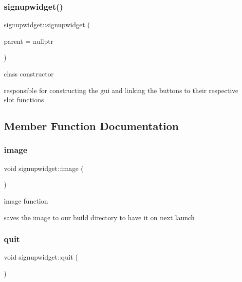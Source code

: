 \subsubsection{\texorpdfstring{signupwidget()}{signupwidget()}}
{\footnotesize\ttfamily signupwidget\+::signupwidget (\begin{DoxyParamCaption}\item[{Q\+Widget $\ast$}]{parent = {\ttfamily nullptr} }\end{DoxyParamCaption})\hspace{0.3cm}{\ttfamily [explicit]}}



class constructor 

responsible for constructing the gui and linking the buttons to their respective slot functions 

\subsection{Member Function Documentation}
\mbox{\label{classsignupwidget_a70de3f9e8d27a1704a3678d3148f6e46}} 
\subsubsection{\texorpdfstring{image}{image}}
{\footnotesize\ttfamily void signupwidget\+::image (\begin{DoxyParamCaption}{ }\end{DoxyParamCaption})\hspace{0.3cm}{\ttfamily [slot]}}



image function 

saves the image to our build directory to have it on next launch \mbox{\label{classsignupwidget_a61682f0dccbdcaa63a4b07434dc52e62}} 
\subsubsection{\texorpdfstring{quit}{quit}}
{\footnotesize\ttfamily void signupwidget\+::quit (\begin{DoxyParamCaption}{ }\end{DoxyParamCaption})\hspace{0.3cm}{\ttfamily [slot]}}



